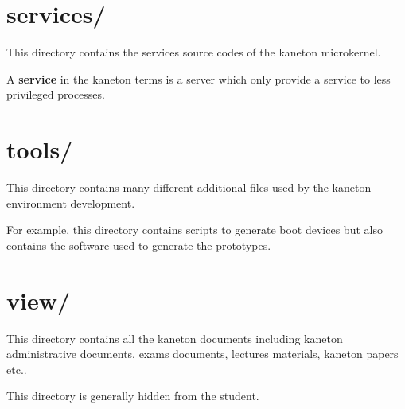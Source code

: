 \section{services/}

This directory contains the services source codes of the kaneton
microkernel.

A \textbf{service} in the kaneton terms is a server which only
provide a service to less privileged processes.

%
%

\section{tools/}

This directory contains many different additional files used by
the kaneton environment development.

For example, this directory contains scripts to generate boot devices
but also contains the software used to generate the prototypes.

%
%

\section{view/}

This directory contains all the kaneton documents including kaneton
administrative documents, exams documents, lectures materials,
kaneton papers etc..

This directory is generally hidden from the student.
